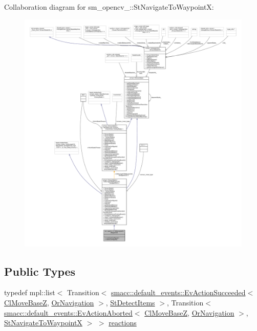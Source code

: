 Collaboration diagram for sm\+\_\+opencv\+\_\+:\+:St\+Navigate\+To\+WaypointX\+:
\nopagebreak
\begin{figure}[H]
\begin{center}
\leavevmode
\includegraphics[width=350pt]{structsm__opencv__2_1_1StNavigateToWaypointX__coll__graph}
\end{center}
\end{figure}
\subsection*{Public Types}
\begin{DoxyCompactItemize}
\item 
typedef mpl\+::list$<$ Transition$<$ \hyperlink{structsmacc_1_1default__events_1_1EvActionSucceeded}{smacc\+::default\+\_\+events\+::\+Ev\+Action\+Succeeded}$<$ \hyperlink{classcl__move__base__z_1_1ClMoveBaseZ}{Cl\+Move\+BaseZ}, \hyperlink{classsm__opencv__2_1_1OrNavigation}{Or\+Navigation} $>$, \hyperlink{structsm__opencv__2_1_1StDetectItems}{St\+Detect\+Items} $>$, Transition$<$ \hyperlink{structsmacc_1_1default__events_1_1EvActionAborted}{smacc\+::default\+\_\+events\+::\+Ev\+Action\+Aborted}$<$ \hyperlink{classcl__move__base__z_1_1ClMoveBaseZ}{Cl\+Move\+BaseZ}, \hyperlink{classsm__opencv__2_1_1OrNavigation}{Or\+Navigation} $>$, \hyperlink{structsm__opencv__2_1_1StNavigateToWaypointX}{St\+Navigate\+To\+WaypointX} $>$ $>$ \hyperlink{structsm__opencv__2_1_1StNavigateToWaypointX_a6924bb2373c2e270c16752321e5d6d36}{reactions}
\end{DoxyCompactItemize}
